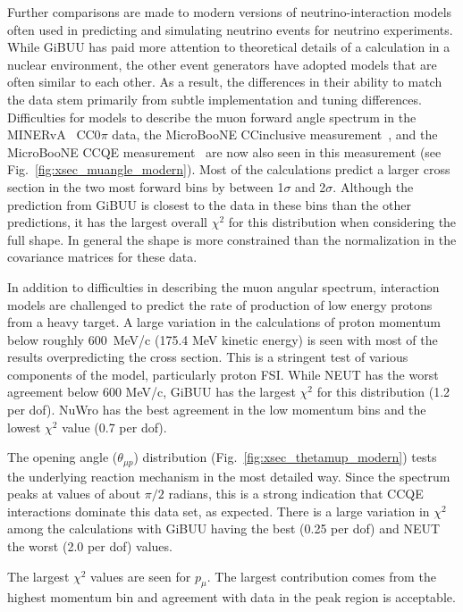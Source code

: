 \documentclass[%
twocolumn,
 amsmath,amssymb,
 aps,
prd,
superscriptaddress,showpacs]{revtex4-2}
\begin{document}
Further comparisons are made to modern versions of neutrino-interaction models often used in predicting and simulating neutrino events for neutrino experiments.
While GiBUU has paid more attention to theoretical details of a calculation in a nuclear environment,
the other event generators have adopted models that are often similar to each other.
As a result, the differences in their ability to match the data stem primarily from subtle implementation and tuning differences.
Difficulties for models to describe the muon forward angle spectrum in the MINERvA~\cite{Ruterbories:2018gub} CC0$\pi$ data, the MicroBooNE CCinclusive measurement~\cite{Adams:2019iqcINCL}, and the MicroBooNE CCQE measurement~\cite{uB_CCQE_2020} are now also seen in this measurement (see Fig.~\ref{fig:xsec_muangle_modern}).
Most of the calculations predict a larger cross section in the two most forward bins by between 1$\sigma$ and 2$\sigma$.
Although the prediction from GiBUU is closest to the data in these bins than the other predictions, it has the largest overall $\chi^2$ for this distribution when considering the full shape.
In general the shape is more constrained than the normalization in the covariance matrices for these data.

In addition to difficulties in describing the muon angular spectrum, interaction models are challenged to predict the rate of production of low energy protons from a heavy target.
A large variation in the calculations of proton momentum below roughly 600~MeV/c (175.4 MeV kinetic energy) is seen with most of the results overpredicting the cross section.
This is a stringent test of various components of the model, particularly proton FSI.
While NEUT has the worst agreement below 600 MeV/c, GiBUU has the largest $\chi^2$ for this distribution (1.2 per dof).
NuWro has the best agreement in the low momentum bins and the lowest $\chi^2$ value (0.7 per dof).


The opening angle ($\theta_{\mu p}$) distribution (Fig.~\ref{fig:xsec_thetamup_modern}) tests the underlying reaction mechanism in the most detailed way.  
Since the spectrum peaks at values of about $\pi/2$ radians, this is a strong indication that CCQE interactions dominate this data set, as expected.
There is a large variation in $\chi^2$ among the calculations with GiBUU having the best (0.25 per dof) and NEUT the worst (2.0 per dof) values.


The largest $\chi^2$ values are seen for $p_\mu$.  
The largest contribution comes from the highest momentum bin and agreement with data in the peak region is acceptable.
\end{document}
